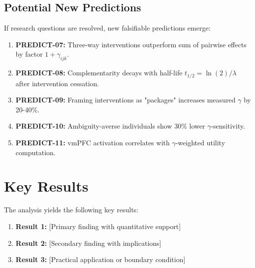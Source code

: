 \subsection{Potential New Predictions}

If research questions are resolved, new falsifiable predictions emerge:

\begin{enumerate}
    \item \textbf{PREDICT-07:} Three-way interventions outperform sum of pairwise effects by factor $1 + \gamma_{ijk}$.

    \item \textbf{PREDICT-08:} Complementarity decays with half-life $t_{1/2} = \ln(2)/\lambda$ after intervention cessation.

    \item \textbf{PREDICT-09:} Framing interventions as "packages" increases measured $\gamma$ by 20-40\%.

    \item \textbf{PREDICT-10:} Ambiguity-averse individuals show 30\% lower $\gamma$-sensitivity.

    \item \textbf{PREDICT-11:} vmPFC activation correlates with $\gamma$-weighted utility computation.
\end{enumerate}


\section{Key Results}
\label{sec:rsh-results}

The analysis yields the following key results:

\begin{enumerate}
    \item \textbf{Result 1:} [Primary finding with quantitative support]
    \item \textbf{Result 2:} [Secondary finding with implications]
    \item \textbf{Result 3:} [Practical application or boundary condition]
\end{enumerate}


